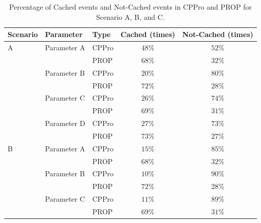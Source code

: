 \documentclass[10pt,final,journal,a4paper]{IEEEtran}
\begin{document}
\begin{table}[!t]
\caption{Percentage of Cached events and Not-Cached events in CPPro and PROP for Scenario A, B, and C.}
\label{tab:stacked1}
\centering
\begin{tabular}{|l|l|l|c|c|}
\hline
Scenario & Parameter & Type & Cached (times)& Not-Cached (times) \\ %
\hline
A & Parameter A & CPPro &  $48\%$ & $52\%$ \\%
\hline
 &  & PROP & $68\%$ & $32\%$ \\ %
\hline

& Parameter B & CPPro & $20\%$ & $80\%$ \\ %
\hline
& & PROP & $72\%$ & $28\%$ \\%
\hline
& Parameter C & CPPro & $26\%$ & $74\%$  \\%
\hline
 & & PROP & $69\%$ & $31\%$ \\%
\hline

& Parameter D & CPPro & $27\%$ & $73\%$  \\%
\hline
 & & PROP & $73\%$ & $27\%$ \\%
\hline

B & Parameter A & CPPro &  $15\%$ & $85\%$ \\%
\hline
 &  & PROP & $68\%$ & $32\%$ \\ %
\hline

& Parameter B & CPPro & $10\%$ & $90\%$ \\ %
\hline
& & PROP & $72\%$ & $28\%$ \\%
\hline
& Parameter C & CPPro & $11\%$ & $89\%$  \\%
\hline
 & & PROP & $69\%$ & $31\%$ \\%
\hline


\end{tabular}
\end{table}
\end{document}
